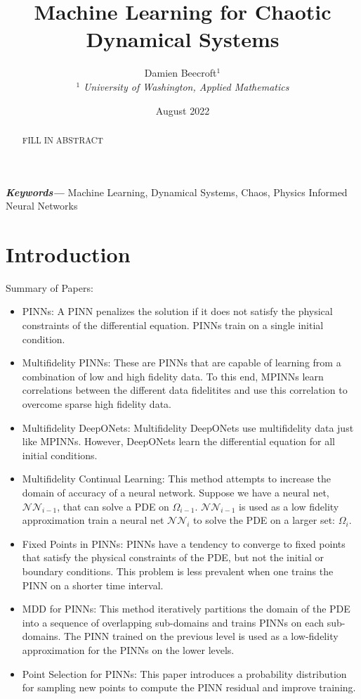 \documentclass[11pt]{article}
\date{August 2022}
\title{Machine Learning for Chaotic Dynamical Systems}
\author{Damien Beecroft$^{1}$  \\
        \small $^{1}$ \it{University of Washington, Applied Mathematics} \\
}
\providecommand{\keywords}[1]
{
  \small	
  \textbf{\textit{Keywords---}} #1
}
\begin{document}
\maketitle
\begin{abstract}
FILL IN ABSTRACT
\end{abstract} \hspace{10pt}

\keywords{Machine Learning, Dynamical Systems, Chaos, Physics Informed Neural Networks}
\section{Introduction}
Summary of Papers:
\begin{itemize}
\item PINNs: A PINN penalizes the solution if it does not satisfy the physical constraints of the differential equation. PINNs train on a single initial condition.
\item Multifidelity PINNs: These are PINNs that are capable of learning from a combination of low and high fidelity data. To this end, MPINNs learn correlations between the different data fidelitites and use this correlation to overcome sparse high fidelity data.
\item Multifidelity DeepONets: Multifidelity DeepONets use multifidelity data just like MPINNs. However, DeepONets learn the differential equation for all initial conditions.
\item Multifidelity Continual Learning: This method attempts to increase the domain of accuracy of a neural network. Suppose we have a neural net, $\mathcal{NN}_{i-1}$, that can solve a PDE on $\Omega_{i-1}$. $\mathcal{NN}_{i-1}$ is used as a low fidelity approximation train a neural net $\mathcal{NN}_i$ to solve the PDE on a larger set: $\Omega_i$.
\item Fixed Points in PINNs: PINNs have a tendency to converge to fixed points that satisfy the physical constraints of the PDE, but not the initial or boundary conditions. This problem is less prevalent when one trains the PINN on a shorter time interval.
\item MDD for PINNs: This method iteratively partitions the domain of the PDE into a sequence of overlapping sub-domains and trains PINNs on each sub-domains. The PINN trained on the previous level is used as a low-fidelity approximation for the PINNs on the lower levels.
\item Point Selection for PINNs: This paper introduces a probability distribution for sampling new points to compute the PINN residual and improve training.

\end{itemize}
\end{document}
